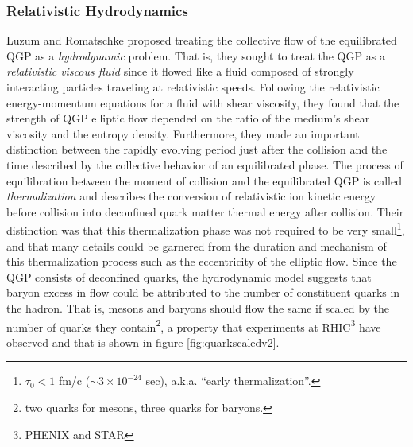 \subsubsection{Relativistic Hydrodynamics}
Luzum and Romatschke \citep{PhysRevC.78.034915} proposed treating the collective flow of the equilibrated QGP as a \textit{hydrodynamic} problem. That is, they sought to treat the QGP as a \textit{relativistic viscous fluid} since it flowed like a fluid composed of strongly interacting particles traveling at relativistic speeds. Following the relativistic energy-momentum equations for a fluid with shear viscosity, they found that the strength of QGP elliptic flow depended on the ratio of the medium's shear viscosity and the entropy density. Furthermore, they made an important distinction between the rapidly evolving period just after the collision and the time described by the collective behavior of an equilibrated phase. The process of equilibration between the moment of collision and the equilibrated QGP is called \textit{thermalization} and describes the conversion of relativistic ion kinetic energy before collision into deconfined quark matter thermal energy after collision. Their distinction was that this thermalization phase was not required to be very small\footnote{$\tau_0 < 1$ fm/c ($\sim 3 \times 10^{-24}$ sec), a.k.a. ``early thermalization''.}, and that many details could be garnered from the duration and mechanism of this thermalization process such as the eccentricity of the elliptic flow. Since the QGP consists of deconfined quarks, the hydrodynamic model suggests that baryon excess in flow could be attributed to the number of constituent quarks in the hadron. That is, mesons and baryons should flow the same if scaled by the number of quarks they contain\footnote{two quarks for mesons, three quarks for baryons.}, a property that experiments at RHIC\footnote{PHENIX and STAR} have observed and that is shown in figure \ref{fig:quarkscaledv2}.

